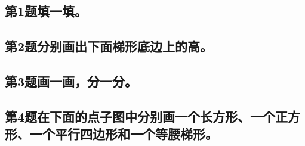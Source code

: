 \subsection*{第1题\quad 填一填。}
\subsection*{第2题\quad 分别画出下面梯形底边上的高。}
\subsection*{第3题\quad 画一画，分一分。}
\subsection*{第4题\quad 在下面的点子图中分别画一个长方形、一个正方形、一个平行四边形和一个等腰梯形。}
